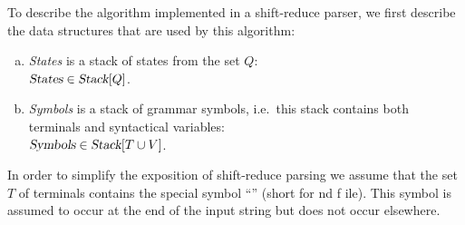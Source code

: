 To describe the algorithm implemented in a shift-reduce parser, we first describe the data structures that are
used by this algorithm:
\begin{enumerate}[(a)]
\item \textsl{States} is a stack of states from the set $Q$:
      \\[0.2cm]
      \hspace*{1.3cm}
      $\textsl{States} \in \textsl{Stack}[Q]$.
\item \textsl{Symbols} is a stack of grammar symbols, i.e.~this stack contains both terminals and syntactical
      variables:
      \\[0.2cm]
      \hspace*{1.3cm}
      $\textsl{Symbols} \in \textsl{Stack}[T \cup V]$.
\end{enumerate}
In order to simplify the exposition of shift-reduce parsing we assume that the set $T$ of terminals contains
the special symbol ``'' (short for \underline{}nd \underline{}f \underline{}ile).
This symbol is assumed to occur at the end of the input string but does not occur elsewhere.

